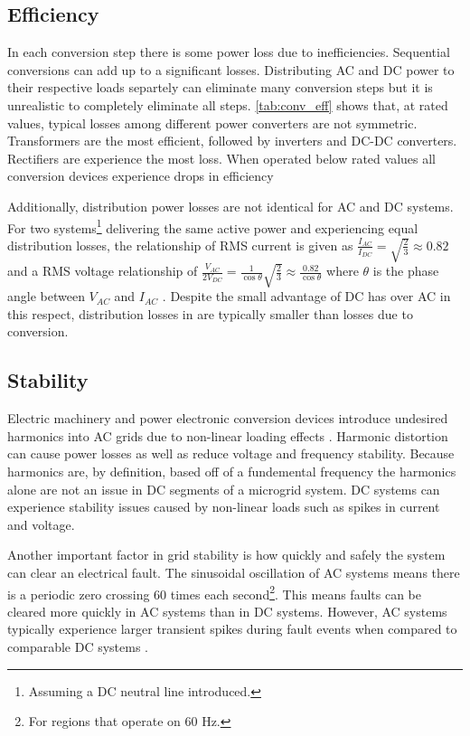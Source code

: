 \subsection{Efficiency}
In each conversion step there is some power loss due to inefficiencies. Sequential conversions can add up to a significant losses. Distributing AC and DC power to their respective loads separtely can eliminate many conversion steps but it is unrealistic to completely eliminate all steps. \autoref{tab:conv_eff} shows that, at rated values, typical losses among different power converters are not symmetric. Transformers are the most efficient, followed by inverters and DC-DC converters. Rectifiers are experience the most loss. When operated below rated values all conversion devices experience drops in efficiency

 

Additionally, distribution power losses are not identical for AC and DC systems. For two systems\footnote{Assuming a DC neutral line introduced.} delivering the same active power and experiencing equal distribution losses, the relationship of RMS current is given as $\frac{I_{AC}}{I_{DC}} = \sqrt{\frac{2}{3}} \approx 0.82$ and a RMS voltage relationship of $\frac{V_{AC}}{2V_{DC}} = \frac{1}{\cos{\theta}} \sqrt{\frac{2}{3}} \approx \frac{0.82}{\cos{\theta}}$ where $\theta$ is the phase angle between $V_{AC}$ and $I_{AC}$ \cite{Starke2008}. Despite the small advantage of DC has over AC in this respect, distribution losses in are typically smaller than losses due to conversion.

\subsection{Stability}
Electric machinery and power electronic conversion devices introduce undesired harmonics into AC grids due to non-linear loading effects \cite{Grotzbach1997}. Harmonic distortion can cause power losses as well as reduce voltage and frequency stability. Because harmonics are, by definition, based off of a fundemental frequency the harmonics alone are not an issue in DC segments of a microgrid system. DC systems can experience stability issues caused by non-linear loads such as spikes in current and voltage.

Another important factor in grid stability is how quickly and safely the system can clear an electrical fault. The sinusoidal oscillation of AC systems means there is a periodic zero crossing 60 times each second\footnote{For regions that operate on 60 Hz.}. This means faults can be cleared more quickly in AC systems than in DC systems.  However, AC systems typically experience larger transient spikes during fault events when compared to comparable DC systems \cite{Estes2011}. 

